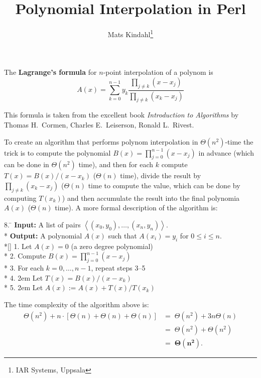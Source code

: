 \documentclass{article}		%
\title{Polynomial Interpolation in Perl}
\author{Mats Kindahl\thanks{IAR Systems, Uppsala}}
\begin{document}
\maketitle

The {\bf Lagrange's formula} for $n$-point interpolation of a polynom
is
\begin{displaymath}
    A(x) = \sum_{k=0}^{n-1} y_k
        \frac{\prod_{j \neq k} (x - x_j)}
         {\prod_{j \neq k} (x_k - x_j)}
\end{displaymath}

This formula is taken from the excellent book \emph{Introduction to
Algorithms} by Thomas H.~Cormen, Charles E.~Leiserson, Ronald
L.~Rivest.

To create an algorithm that performs polynom interpolation in
$\Theta(n^2)$-time the trick is to compute the polynomial $B(x) =
\prod_{j=0}^{n-1} (x - x_j)$ in advance (which can be done in
$\Theta(n^2)$ time), and then for each $k$ compute $T(x) = B(x) / (x -
x_k)$ ($\Theta(n)$ time), divide the result by $\prod_{j \neq k} (x_k
- x_j)$ ($\Theta(n)$ time to compute the value, which can be done by
computing $T(x_k)$) and then accumulate the result into the final
polynomia $A(x)$ ($\Theta(n)$ time).
%
A more formal description of the algorithm is:

\bigskip
\hspace{2em}\begin{minipage}{0.7\hsize}
\begin{tabbing}
8. \=\kill
\textbf{Input:} 
A list of pairs $\left<(x_0,y_0),\ldots,(x_n,y_n)\right>$. 
\\*
%
\textbf{Output:} 
A polynomial $A(x)$ such that $A(x_i) = y_i$ for $0 \leq i \leq n$.
\\*[\medskipamount]
%
1.      \>Let $A(x) = 0$ (a zero degree polynomial) \\*
2.      \>Compute $B(x) = \prod_{j=0}^{n-1} (x - x_j)$ \\*
3.      \>For each $k = 0,\ldots,n-1$, repeat steps 3--5 \\*
4.      \>\kern2em Let $T(x) = B(x) / (x - x_k)$ \\*
5.      \>\kern2em Let $A(x) := A(x) + T(x) / T(x_k)$
\end{tabbing}
\end{minipage}
\bigskip

The time complexity of the algorithm above is: 
\begin{displaymath}
\begin{split}
   \Theta(n^2) + n \cdot \left[\Theta(n) + \Theta(n) + \Theta(n)\right] 
	&=\; \Theta(n^2) + 3n \Theta(n) \\
	&=\; \Theta(n^2) + \Theta(n^2) \\
	&=\; \mathbf{\Theta(n^2)}.
\end{split}
\end{displaymath}
\end{document}
